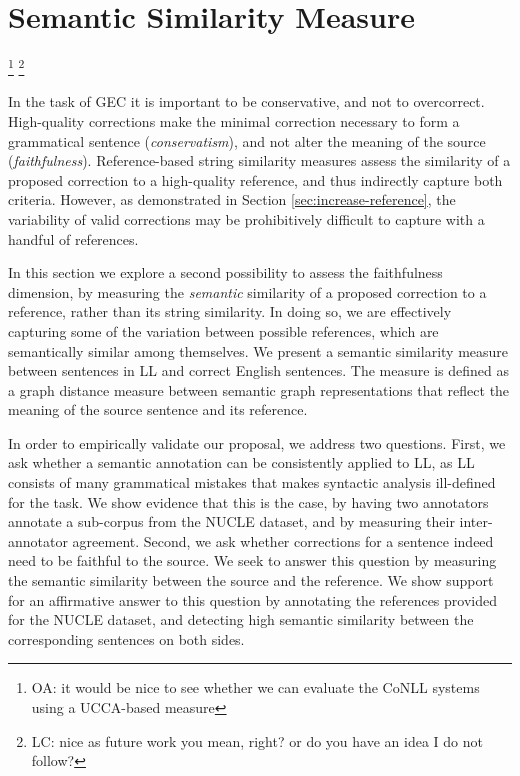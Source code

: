 \documentclass[letter,11pt]{article}
\newcommand{\oa}[1]{\footnote{\color{red}OA: #1}}
\newcommand{\lc}[1]{\footnote{\color{green}LC: #1}}
\begin{document}
\section{Semantic Similarity Measure}\label{sec:Semantics}



\oa{it would be nice to see whether we can evaluate the CoNLL systems using
a UCCA-based measure} \lc{nice as future work you mean, right? or do you have an idea I do not follow?}


In the task of GEC it is important to be
conservative, and not to overcorrect. High-quality corrections make the minimal correction
necessary to form a grammatical sentence (\textit{conservatism}), and not alter the
meaning of the source (\textit{faithfulness}). Reference-based string similarity measures
assess the similarity of a proposed correction to a high-quality reference, 
and thus indirectly capture both criteria. However, as demonstrated in Section \ref{sec:increase-reference},
the variability of valid corrections may be prohibitively difficult
to capture with a handful of references.

In this section we explore a second possibility to assess the faithfulness dimension, by
measuring the {\it semantic} similarity of a proposed correction to a reference, rather
than its string similarity. In doing so, we are effectively capturing some of the variation
between possible references, which are semantically similar among themselves.
We present a semantic similarity measure between sentences in LL and
correct English sentences. The measure is defined as a graph distance measure between
semantic graph representations that reflect the meaning of the source sentence and its reference. 

In order to empirically validate our proposal, we address two
questions. First, we ask whether a semantic annotation can be consistently
applied to LL, as LL consists of many grammatical mistakes that makes syntactic analysis ill-defined for the task. We show evidence that this is the case, by having two annotators annotate a sub-corpus from the NUCLE dataset, and by measuring their inter-annotator agreement.
Second, we ask whether corrections for a sentence indeed need to be faithful to the source. We seek to answer this question by measuring
the semantic similarity between the source and the reference. We show support for an affirmative answer to this question 
by annotating the references provided for the NUCLE dataset,
and detecting high semantic similarity between the corresponding sentences on both sides. 
\end{document}
